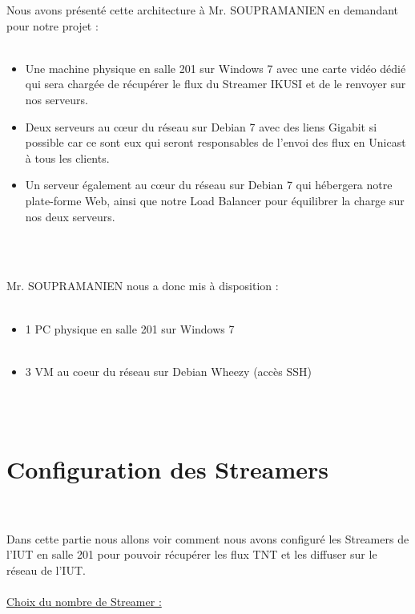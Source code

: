 \documentclass{report}
\begin{document}
	Nous avons présenté cette architecture à Mr. SOUPRAMANIEN en demandant pour notre projet :
	\\
	\\
	\begin{itemize}
    \item Une machine physique en salle 201 sur Windows 7 avec une carte vidéo dédié qui sera chargée de récupérer le flux du Streamer IKUSI et de le renvoyer sur nos serveurs.

    \item Deux serveurs au cœur du réseau sur Debian 7 avec des liens Gigabit si possible car ce sont eux qui seront responsables de l'envoi des flux en Unicast à tous les clients.

    \item Un serveur également au cœur du réseau sur Debian 7 qui hébergera notre plate-forme Web, ainsi que notre Load Balancer pour équilibrer la charge sur nos deux serveurs.
    \end{itemize}
    \\
    \\
    
    \hfill
    
    Mr. SOUPRAMANIEN nous a donc mis à disposition :
    \\
    \\
    \begin{itemize}
    \item 1 PC physique en salle 201 sur Windows 7
    \\
    \\
    \item 3 VM au coeur du réseau sur Debian Wheezy  (accès SSH)
    \end{itemize}
    \\
    \\
    \section{Configuration des Streamers}  
    \\
    \\
    Dans cette partie nous allons voir comment nous avons configuré les Streamers de l’IUT en salle 201 pour pouvoir récupérer les flux TNT et les diffuser sur le réseau de l’IUT.
    \\
    \\
    
	\underline{Choix du nombre de Streamer :}\\
	
\end{document}
